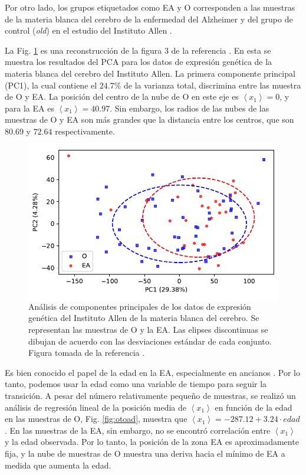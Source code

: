 Por otro lado, los grupos etiquetados como EA y O corresponden a las muestras de la materia blanca del cerebro de la enfermedad del Alzheimer y del grupo de control (\textit{old}) en el estudio del Instituto Allen \cite{Miller_2017}. 

La Fig. \ref{fig:pcaotoad} es una reconstrucción de la figura 3 de la referencia \cite{Gonzalez_2021}. En esta se muestra los resultados del PCA para los datos de expresión genética de la materia blanca del cerebro del Instituto Allen. La primera componente principal (PC1), la cual contiene el $24.7 \%$ de la varianza total, discrimina entre las muestra de O y EA. La posición del centro de la nube de O en este eje es $\left\langle x_1 \right\rangle  = 0 $, y para la EA es $\left\langle x_1 \right\rangle = 40.97 $. Sin embargo, los radios de las nubes de las muestras de O y EA son más grandes que la distancia entre los centros, que son $80.69$ y $72.64$ respectivamente.

\begin{figure}[!htb]
	\centering
	\includegraphics[width=0.75\linewidth]{figures/pca_o_to_ad_1}
	\caption{ Análisis de componentes principales de los datos de expresión genética del Instituto Allen de la materia blanca del cerebro. Se representan las muestras de O y la EA. Las elipses discontinuas se dibujan de acuerdo con las desviaciones estándar de cada conjunto. Figura tomada de la referencia \cite{Gonzalez_2021}.}
	\label{fig:pcaotoad}
\end{figure}

Es bien conocido el papel de la edad en la EA, especialmente en ancianos \cite{alz2019}. Por lo tanto, podemos usar la edad como una variable de tiempo para seguir la transición. A pesar del número relativamente pequeño de muestras, se realizó un análisis de regresión lineal de la posición media de $\left\langle x_1 \right\rangle$ en función de la edad en las muestras de O, Fig. \ref{fig:otoad}, muestra que $\left\langle x_1 \right\rangle = -287.12 + 3.24 \cdot edad$. En las muestras de la EA, sin embargo, no se encontró correlación entre $\left\langle x_1 \right\rangle$ y la edad observada. Por lo tanto, la posición de la zona EA es aproximadamente fija, y la nube de muestras de O muestra una deriva hacia el mínimo de EA a medida que aumenta la edad.


